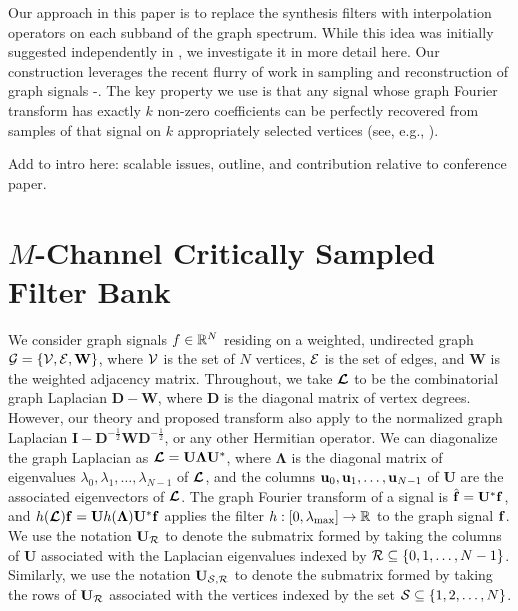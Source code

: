 \documentclass[journal, 10pt]{IEEEtran}
\begin{document}
Our approach in this paper is to replace the synthesis filters with interpolation operators on each subband of the graph spectrum. While this idea was initially suggested independently in \cite{chen2015discrete}, we investigate it in more detail here. Our construction leverages the recent flurry of work in sampling and reconstruction of graph signals \cite{chen2015discrete}-\nocite{pesenson_paley,narang2013interpolation,anis2014towards,gadde2015probabilistic,shomorony,PuyTGV15,chen2015signal,tsitsvero2016uncertainty,chen2016signal}\cite{anis2016efficient}. The key property we use is that any signal whose graph Fourier transform has exactly $k$ non-zero coefficients can be perfectly recovered from samples of that signal on $k$ appropriately selected vertices (see, e.g., \cite[Theorem 1]{chen2015discrete} \cite[Proposition 1]{anis2016efficient}).

{\color{red} Add to intro here: scalable issues, outline, and contribution relative to conference paper.}


\section{$M$-Channel Critically Sampled Filter Bank}
We consider graph signals $f \in \mathbb{R}^N$ residing on a weighted, undirected graph ${\mathcal{G}}=\{{\mathcal{V}},{\mathcal{E}},\mathbf{W}\}$, where ${\mathcal{V}}$ is the set of $N$ vertices, ${\mathcal{E}}$ is the set of edges, and $\mathbf{W}$ is the weighted adjacency matrix. 
Throughout, we take $\boldsymbol{\mathcal{L}}$ to be the combinatorial graph Laplacian $\mathbf{D}-\mathbf{W}$, where $\mathbf{D}$ is the diagonal matrix of vertex degrees. However, our theory and proposed transform also apply to the normalized graph Laplacian $\mathbf{I}-\mathbf{D}^{-\frac{1}{2}}\mathbf{W}\mathbf{D}^{-\frac{1}{2}}$, or any other Hermitian operator. We can diagonalize the graph Laplacian as $\boldsymbol{\mathcal{L}}=\mathbf{U}{\boldsymbol \Lambda}\mathbf{U}^{*}$, where ${\boldsymbol \Lambda}$ is the diagonal matrix of eigenvalues $\lambda_0,\lambda_1,\ldots,\lambda_{N-1}$ of $\boldsymbol{\mathcal{L}}$, and the columns ${\bf u}_0,{\bf u}_1,\ldots,{\bf u}_{N-1}$ of $\mathbf{U}$ are the associated eigenvectors of $\boldsymbol{\mathcal{L}}$. The graph Fourier transform of a signal is $\hat{\bf{f}}=\mathbf{U}^{*}{\bf f}$, and ${h}(\boldsymbol{\mathcal{L}}){\bf f}=\mathbf{U}{h}({\boldsymbol \Lambda})\mathbf{U}^{*}{\bf f}$ applies the filter ${h}: [0,\lambda_{\max}] \rightarrow \mathbb{R}$ to the graph signal ${\bf f}$. We use the notation $\mathbf{U}_{{\cal R}}$ to denote the submatrix formed by taking the columns of $\mathbf{U}$ associated with the Laplacian eigenvalues indexed by ${\cal R} \subseteq \{0,1,\ldots,N-1\}$. Similarly, we use the notation $\mathbf{U}_{{\cal S},{\cal R}}$ to denote the submatrix  formed by taking the rows of $\mathbf{U}_{{\cal R}}$ associated with the vertices indexed by the set ${\cal S} \subseteq \{1,2,\ldots,N\}$.
\end{document}
